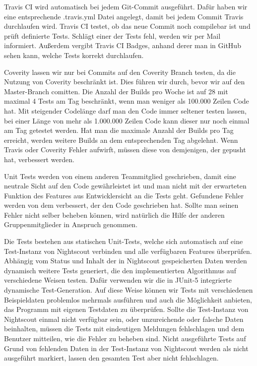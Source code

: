 \documentclass[accentcolor=tud0b,12pt,paper=a4]{tudreport}
\begin{document}
Travis CI wird automatisch bei jedem Git-Commit ausgeführt. Dafür haben wir eine entsprechende .travis.yml Datei angelegt, damit bei jedem Commit Travis durchlaufen wird. Travis CI testet, ob das neue Commit noch compilebar ist und prüft definierte Tests. Schlägt einer der Tests fehl, werden wir per Mail informiert. Außerdem vergibt Travis CI Badges, anhand derer man in GitHub sehen kann, welche Tests korrekt durchlaufen. 

Coverity lassen wir nur bei Commits auf den Coverity Branch testen, da die Nutzung von Coverity beschränkt ist. Dies führen wir durch, bevor wir auf den Master-Branch comitten. Die Anzahl der Builds pro Woche ist auf 28 mit maximal 4 Tests am Tag beschränkt, wenn man weniger als 100.000 Zeilen Code hat. Mit steigender Codelänge darf man den Code immer seltener testen lassen, bei einer Länge von mehr als 1.000.000 Zeilen Code kann dieser nur noch einmal am Tag getestet werden. Hat man die maximale Anzahl der Builds pro Tag erreicht, werden weitere Builds an dem entsprechenden Tag abgelehnt. Wenn Travis oder Coverity Fehler aufwirft, müssen diese von demjenigen, der gepusht hat, verbessert werden. 

Unit Tests werden von einem anderen Teammitglied geschrieben, damit eine neutrale Sicht auf den Code gewährleistet ist und man nicht mit der erwarteten Funktion des Features aus Entwicklersicht an die Tests geht. Gefundene Fehler werden von dem verbessert, der den Code geschrieben hat. Sollte man seinen Fehler nicht selber beheben können, wird natürlich die Hilfe der anderen Gruppenmitglieder in Anspruch genommen.

Die Tests bestehen aus statischen Unit-Tests, welche sich automatisch auf eine Test-Instanz von Nightscout verbinden und alle verfügbaren Features überprüfen. Abhängig vom Status und Inhalt der in Nightscout gespeicherten Daten werden dynamisch weitere Tests generiert, die den implementierten Algorithmus auf verschiedene Weisen testen. Dafür verwenden wir die in JUnit-5 integrierte dynamische Test-Generation. Auf diese Weise können wir Tests mit verschiedenen Beispieldaten problemlos mehrmals ausführen und auch die Möglichkeit anbieten, das Programm mit eigenen Testdaten zu überprüfen. Sollte die Test-Instanz von Nightscout einmal nicht verfügbar sein, oder unzureichende oder falsche Daten beinhalten, müssen die Tests mit eindeutigen Meldungen fehlschlagen und dem Benutzer mitteilen, wie die Fehler zu beheben sind. Nicht ausgeführte Tests auf Grund von fehlenden Daten in der Test-Instanz von Nightscout werden als nicht ausgeführt markiert, lassen den gesamten Test aber nicht fehlschlagen.
\newpage 
\end{document}
